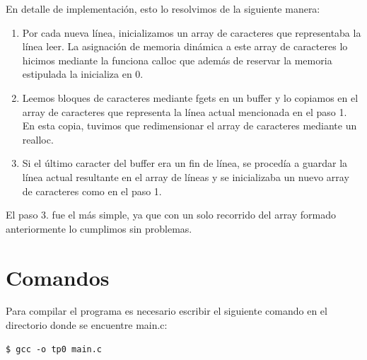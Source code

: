 \documentclass[a4paper,11pt]{article}
\begin{document}
En detalle de implementaci\'on, esto lo resolvimos de la siguiente manera:
\begin{enumerate}
	\item Por cada nueva l\'inea, inicializamos un array de caracteres que representaba la l\'inea leer. La asignaci\'on de memoria din\'amica a este array de caracteres lo hicimos mediante la funciona calloc que adem\'as de reservar la memoria estipulada la inicializa en 0.
	\item Leemos bloques de caracteres mediante fgets en un buffer y lo copiamos en el array de caracteres que representa la l\'inea actual mencionada en el paso 1. En esta copia, tuvimos que redimensionar el array de caracteres mediante un realloc.
	\item Si el \'ultimo caracter del buffer era un fin de l\'inea, se proced\'ia a guardar la l\'inea actual resultante en el array de l\'ineas y se inicializaba un nuevo array de caracteres como en el paso 1.
\end{enumerate}


El paso 3. fue el m\'as simple, ya que con un solo recorrido del array formado anteriormente lo cumplimos sin problemas.

\section{Comandos}
Para compilar el programa es necesario escribir el siguiente comando en el directorio donde se encuentre main.c:

\lstset{language=bash, breaklines=true, basicstyle=\normalsize}
\begin{lstlisting}
$ gcc -o tp0 main.c
\end{lstlisting}
\end{document}
